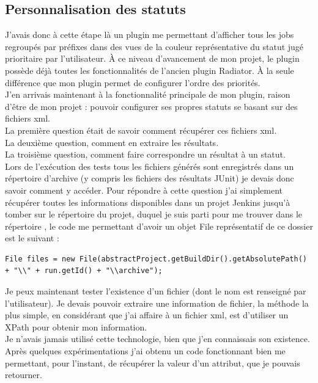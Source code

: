 
\subsection{Personnalisation des statuts}

J'avais donc à cette étape là un plugin me permettant d'afficher tous les jobs regroupés par préfixes dans des vues de la couleur représentative du statut jugé prioritaire par l'utilisateur. \`{A} ce niveau d'avancement de mon projet, le plugin possède déjà toutes les fonctionnalités de l'ancien plugin Radiator. \`{A} la seule différence que mon plugin permet de configurer l'ordre des priorités.\\
J'en arrivais maintenant à la fonctionnalité principale de mon plugin, raison d'être de mon projet : pouvoir configurer ses propres statuts se basant sur des fichiers xml.\\
La première question était de savoir comment récupérer ces fichiers xml.\\
La deuxième question, comment en extraire les résultats.\\
La troisième question, comment faire correspondre un résultat à un statut.\\

Lors de l'exécution des tests tous les fichiers générés sont enregistrés dans un répertoire d'archive (y compris les fichiers des résultats JUnit) je devais donc savoir comment y accéder. Pour répondre à cette question j'ai simplement récupérer toutes les informations disponibles dans un projet Jenkins jusqu'à tomber sur le répertoire du projet, duquel je suis parti pour me trouver dans le répertoire , le code me permettant d'avoir un objet File représentatif de ce dossier est le suivant :\\
\begin{lstlisting}
File files = new File(abstractProject.getBuildDir().getAbsolutePath() + "\\" + run.getId() + "\\archive");
\end{lstlisting}

Je peux maintenant tester l'existence d'un fichier (dont le nom est renseigné par l'utilisateur). Je devais pouvoir extraire une information de fichier, la méthode la plus simple, en considérant que j'ai affaire à un fichier xml, est d'utiliser un XPath pour obtenir mon information.\\
Je n'avais jamais utilisé cette technologie, bien que j'en connaissais son existence. Après quelques expérimentations j'ai obtenu un code fonctionnant bien me permettant, pour l'instant, de récupérer la valeur d'un attribut, que je pouvais retourner.\\

